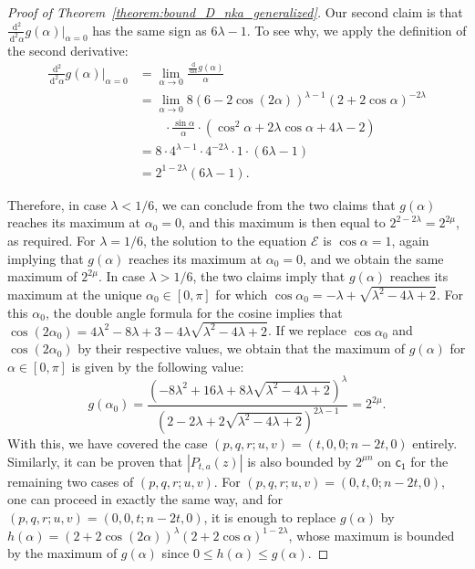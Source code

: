 \documentclass[runningheads,orivec]{llncs}
\newcommand{\dd}{\,\mathrm d}
\newcommand{\dis}{\mathsf{c_1}}
\let\leq=\leqslant
\begin{document}
\begin{proof}[Proof of Theorem~\ref{theorem:bound_D_nka_generalized}]
        Our second claim is that $\frac{\dd^2}{\dd^2\alpha}g(\alpha)\vert_{\alpha=0}$ has the same sign as $6\lambda -1$. To see why, we apply the definition of the second derivative:
        \begin{align*}
            \frac{\dd^2}{\dd^2\alpha}g(\alpha)\vert_{\alpha=0}
            &=\lim_{\alpha\to 0}\frac{\frac{\dd}{\dd\alpha}g(\alpha)}{\alpha}\\
            &=\lim_{\alpha\to 0}8(6-2\cos(2\alpha))^{\lambda-1}(2+2\cos\alpha)^{-2\lambda}\\
    		&\qquad\cdot\frac{\sin\alpha}{\alpha}\cdot\left(\cos^2\alpha+2\lambda\cos\alpha+4\lambda-2\right)\\
            &=8\cdot4^{\lambda-1}\cdot 4^{-2\lambda}\cdot 1\cdot(6\lambda -1)\\
            &=2^{1-2\lambda}(6\lambda -1).
        \end{align*}
        
        Therefore, in case $\lambda<1/6$, we can conclude from the two claims that $g(\alpha)$ reaches its maximum at $\alpha_0=0$, and this maximum is then equal to $2^{2-2\lambda}=2^{2\mu}$, as required. For $\lambda=1/6$, the solution to the equation $\mathcal E$ is $\cos\alpha=1$, again implying that $g(\alpha)$ reaches its maximum at $\alpha_0=0$, and we obtain the same maximum of $2^{2\mu}$. In case $\lambda>1/6$, the two claims imply that $g(\alpha)$ reaches its maximum at the unique $\alpha_0\in[0,\pi]$ for which $\cos\alpha_0=-\lambda+\sqrt{\lambda^2-4\lambda+2}$. For this $\alpha_0$, the double angle formula for the cosine implies that $\cos(2\alpha_0)=4\lambda^2-8\lambda+3-4\lambda\sqrt{\lambda^2-4\lambda+2}$. If we replace $\cos\alpha_0$ and $\cos(2\alpha_0)$ by their respective values, we obtain that the maximum of $g(\alpha)$ for $\alpha\in[0,\pi]$ is given by the following value:
        \[
            g(\alpha_0)=\frac{\left(-8\lambda^2+16\lambda+8\lambda\sqrt{\lambda^2-4\lambda+2}\right)^{\lambda}}{\left(2-2\lambda+2\sqrt{\lambda^2-4\lambda+2}\right)^{2\lambda-1}}=2^{2\mu}.
        \]
        With this, we have covered the case $(p,q,r;u,v)=(t,0,0;n-2t,0)$ entirely. Similarly, it can be proven that $|P_{t,a}(z)|$ is also bounded by $2^{\mu n}$ on $\dis$ for the remaining two cases of $(p,q,r;u,v)$. For $(p,q,r;u,v)=(0,t,0;n-2t,0)$, one can proceed in exactly the same way, and for $(p,q,r;u,v)=(0,0,t;n-2t,0)$, it is enough to replace $g(\alpha)$ by $h(\alpha)=(2+2\cos(2\alpha))^\lambda(2+2\cos\alpha)^{1-2\lambda}$, whose maximum is bounded by the maximum of $g(\alpha)$ since $0\leq h(\alpha)\leq g(\alpha)$.
    \end{proof}

    
\end{document}

